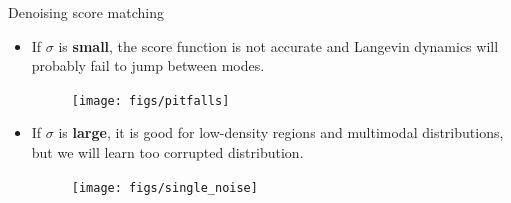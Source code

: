 \begin{frame}{Denoising score matching}
	\begin{itemize}
		\item If $\sigma$ is \textbf{small}, the score function is not accurate and Langevin dynamics will probably fail to jump between modes.
		\begin{figure}
			\texttt{[image: figs/pitfalls]}
		\end{figure}
		\item If $\sigma$ is \textbf{large}, it is good for low-density regions and  multimodal distributions, but we will learn too corrupted distribution.
		\begin{figure}
			\texttt{[image: figs/single\_noise]}
		\end{figure}
	\end{itemize}
\end{frame}
